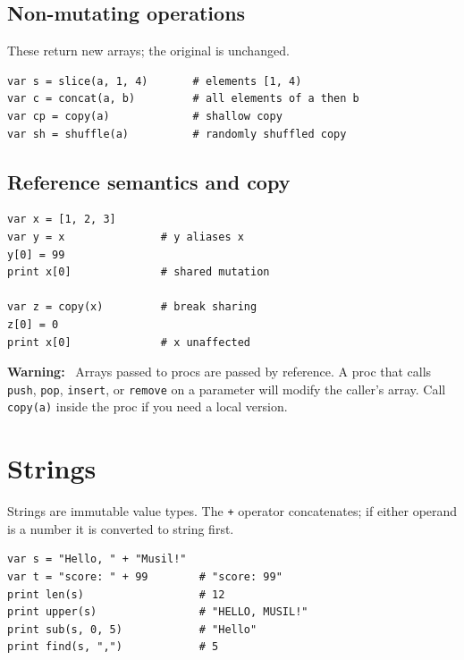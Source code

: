 \documentclass[11pt,a4paper]{article}
\newcommand{\musil}[1]{\lstinline[style=musilinline]{#1}}
\newenvironment{warn}{\begin{mdframed}[backgroundcolor=red!6,linecolor=musilred,linewidth=0.8pt]\textbf{Warning:}\ }{\end{mdframed}}
\begin{document}
\subsection{Non-mutating operations}

These return new arrays; the original is unchanged.

\begin{lstlisting}
var s = slice(a, 1, 4)       # elements [1, 4)
var c = concat(a, b)         # all elements of a then b
var cp = copy(a)             # shallow copy
var sh = shuffle(a)          # randomly shuffled copy
\end{lstlisting}

\subsection{Reference semantics and copy}

\begin{lstlisting}
var x = [1, 2, 3]
var y = x               # y aliases x
y[0] = 99
print x[0]              # shared mutation

var z = copy(x)         # break sharing
z[0] = 0
print x[0]              # x unaffected
\end{lstlisting}

\begin{warn}
Arrays passed to procs are passed by reference. A proc that calls
\musil{push}, \musil{pop}, \musil{insert}, or \musil{remove} on a parameter
will modify the caller's array. Call \musil{copy(a)} inside the proc if you
need a local version.
\end{warn}

\section{Strings}
\label{sec:strings}

Strings are immutable value types. The \texttt{+} operator concatenates;
if either operand is a number it is converted to string first.

\begin{lstlisting}
var s = "Hello, " + "Musil!"
var t = "score: " + 99        # "score: 99"
print len(s)                  # 12
print upper(s)                # "HELLO, MUSIL!"
print sub(s, 0, 5)            # "Hello"
print find(s, ",")            # 5
\end{lstlisting}
\end{document}
